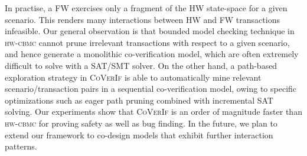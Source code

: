 \documentclass[sigconf]{acmart}
\newcommand{\tool}[1]{\textsc{#1}\xspace}
\newcommand{\hwcbmcv}{\tool{hw-cbmc}}
\newcommand{\verifox}{\tool{CoVerIf}}
\begin{document}
In practise, a FW exercises only a fragment of the HW state-space for a given scenario.  
This renders many interactions between HW and FW transactions infeasible.   
Our general observation is that bounded model checking technique in \hwcbmcv 
cannot prune irrelevant transactions with respect to a given scenario, 
and hence generate a monolithic co-verification model, which are often 
extremely difficult to solve with a SAT/SMT solver. On the other hand, 
a path-based exploration strategy in \verifox is able to automatically 
mine relevant scenario/transaction pairs in a sequential co-verification 
model, owing to specific optimizations such as eager path pruning
combined with incremental SAT solving.  Our experiments show that \verifox 
is an order of magnitude faster than \hwcbmcv for proving safety as well as 
bug finding.  In the future, we plan to extend our framework to co-design 
models that exhibit further interaction patterns.

%

 
\end{document}
